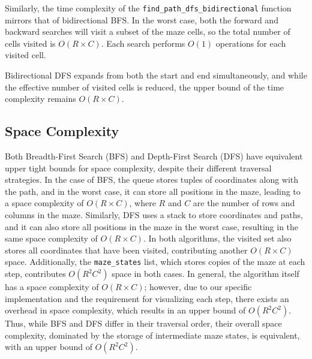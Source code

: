\documentclass[final, journal, 11pt]{report}
\begin{document}
	Similarly, the time complexity of the \texttt{find\_path\_dfs\_bidirectional} function mirrors that of bidirectional BFS. In the worst case, both the forward and backward searches will visit a subset of the maze cells, so the total number of cells visited is \( O(R \times C) \). Each search performs \( O(1) \) operations for each visited cell. 
	
	Bidirectional DFS expands from both the start and end simultaneously, and while the effective number of visited cells is reduced, the upper bound of the time complexity remains \( O(R \times C) \).
	
	
	
	
	
	
	
	
	
	
	\subsection*{Space Complexity}
		Both Breadth-First Search (BFS) and Depth-First Search (DFS) have equivalent upper tight bounds for space complexity, despite their different traversal strategies. In the case of BFS, the queue stores tuples of coordinates along with the path, and in the worst case, it can store all positions in the maze, leading to a space complexity of \( O(R \times C) \), where \( R \) and \( C \) are the number of rows and columns in the maze. Similarly, DFS uses a stack to store coordinates and paths, and it can also store all positions in the maze in the worst case, resulting in the same space complexity of \( O(R \times C) \). In both algorithms, the visited set also stores all coordinates that have been visited, contributing another \( O(R \times C) \) space. Additionally, the \texttt{maze\_states} list, which stores copies of the maze at each step, contributes \( O(R^2 C^2) \) space in both cases. In general, the algorithm itself has a space complexity of \( O(R \times C) \); however, due to our specific implementation and the requirement for visualizing each step, there exists an overhead in space complexity, which results in an upper bound of \( O(R^2 C^2) \). Thus, while BFS and DFS differ in their traversal order, their overall space complexity, dominated by the storage of intermediate maze states, is equivalent, with an upper bound of \( O(R^2 C^2) \).
		
\end{document}
